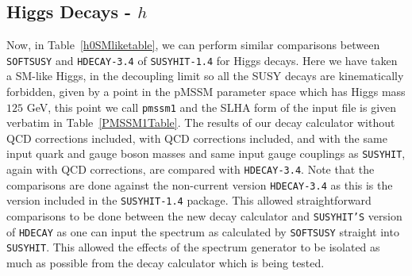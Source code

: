 \documentclass[final,3p,times]{elsarticle}
\def\code#1{{\tt #1}}
\begin{document}
\subsection{Higgs Decays - $h$}

Now, in Table~\ref{h0SMliketable}, we can perform similar comparisons between
{\tt SOFTSUSY} and {\tt HDECAY-3.4} of {\tt SUSYHIT-1.4} for Higgs
decays. Here we have taken a SM-like Higgs, in the decoupling limit so all the
SUSY decays are kinematically forbidden, given by a point in the pMSSM parameter space
which has Higgs mass $125$ GeV, this point we call {\tt pmssm1} and the SLHA \cite{Skands:2003cj} form of the input file is given verbatim in Table~\ref{PMSSM1Table}. The results of our decay calculator without QCD
corrections included, with QCD corrections included, and with the same input
quark and gauge boson masses and same input gauge couplings as {\tt SUSYHIT},
again with QCD corrections, are compared with {\tt HDECAY-3.4}. Note that the 
comparisons are done against the non-current version {\tt HDECAY-3.4} as this is the 
version included in the {\tt SUSYHIT-1.4} package. This allowed straightforward comparisons to be done between the new decay
calculator and {\tt SUSYHIT'S} version of \code{HDECAY} as one can input the spectrum as calculated by {\tt SOFTSUSY} straight into {\tt SUSYHIT}. This allowed the effects of the spectrum generator to be isolated as much as possible from the decay calculator which is being tested.
\end{document}
